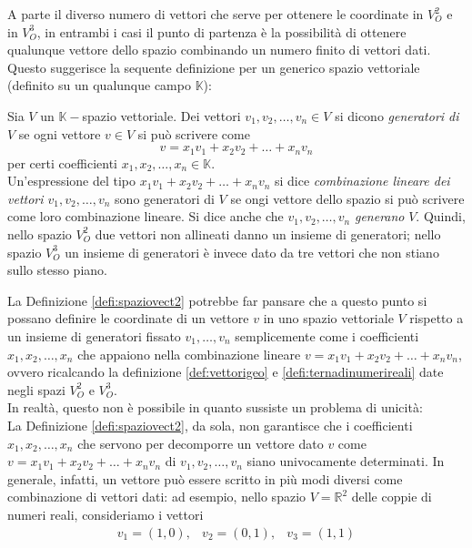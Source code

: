 A parte il diverso numero di vettori che serve per ottenere le coordinate in $V_O^2$ e in $V_O^3$, in entrambi i casi il punto di partenza è la possibilità di ottenere qualunque vettore dello spazio combinando un numero finito di vettori dati.\\
Questo suggerisce la sequente definizione per un generico spazio vettoriale (definito su un qualunque campo $\mathds{K}$):
\begin{defi}
  \label{defi:spaziovect2}
  Sia $V$ un $\mathds{K}-$spazio vettoriale. Dei vettori $v_1,v_2,\dots,v_n\in V$ si dicono \textit{generatori di $V$} se ogni vettore $v\in V$ si può scrivere come
  \begin{equation*}
    v=x_1v_1+x_2v_2+\dots+x_nv_n
  \end{equation*}
  per certi coefficienti $x_1,x_2,\dots,x_n\in\mathds{K}$.\\
  Un'espressione del tipo $x_1v_1+x_2v_2+\dots+x_nv_n$ si dice \textit{combinazione lineare dei vettori $v_1,v_2,\dots,v_n$} sono generatori di $V$ se ongi vettore dello spazio si può scrivere come loro combinazione lineare. Si dice anche che $v_1,v_2,\dots,v_n$ \textit{generano} $V$. Quindi, nello spazio $V_O^2$ due vettori non allineati danno un insieme di generatori; nello spazio $V_O^3$ un insieme di generatori è invece dato da tre vettori che non stiano sullo stesso piano.
\end{defi}
La Definizione \ref{defi:spaziovect2} potrebbe far pansare che a questo punto si possano definire le coordinate di un vettore $v$ in uno spazio vettoriale $V$ rispetto a un insieme di generatori fissato $v_1,\dots, v_n$ semplicemente come i coefficienti $x_1,x_2,\dots,x_n$ che appaiono nella combinazione lineare $v=x_1v_1+x_2v_2+\dots+x_nv_n$, ovvero ricalcando la definizione \ref{def:vettorigeo} e \ref{defi:ternadinumerireali} date negli spazi $V_O^2$ e $V_O^3$.\\
In realtà, questo non è possibile in quanto sussiste un problema di unicità:\\
La Definizione \ref{defi:spaziovect2}, da sola, non garantisce che i coefficienti $x_1,x_2,\dots, x_n$ che servono per decomporre un vettore dato $v$ come $v=x_1v_1+x_2v_2+\dots +x_nv_n$ di $v_1,v_2,\dots, v_n$ siano univocamente determinati. In generale, infatti, un vettore può essere scritto in più modi diversi come combinazione di vettori dati: ad esempio, nello spazio $V=\mathds{R}^2$ delle coppie di numeri reali, consideriamo i vettori
\begin{eqnarray*}
  v_1=(1,0), & v_2=(0,1), & v_3=(1,1)
\end{eqnarray*}
